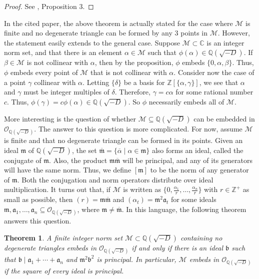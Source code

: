 \documentclass[10pt]{amsart}
\newcommand{\M}{\mathcal{M}}
\newcommand{\Q}{\mathbb{Q}}
\newcommand{\Z}{\mathbb{Z}}
\newcommand{\C}{\mathbb{C}}
\renewcommand{\a}{\mathfrak{a}}
\renewcommand{\b}{\mathfrak{b}}
\newcommand{\m}{\mathfrak{m}}
\renewcommand{\bar}{\overline}
\newcommand{\thefield}{\Q(\sqrt{-D})}
\newcommand{\thering}{\mathcal{O}_{\Q(\sqrt{-D})}}
\newcommand{\norm}[1]{\left[#1\right]}
\newtheorem{thm}{Theorem}
\begin{document}
\begin{proof}
See \cite{Kn15}, Proposition 3.
\end{proof}

In the cited paper, the above theorem is actually stated for the case where $\M$ is finite and no degenerate triangle can be formed by any 3 points in $\M$.  However, the statement easily extends to the general case.  Suppose $\M \subset \C$ is an integer norm set, and that there is an element $\alpha \in \M$ such that $\phi(\alpha) \in \Q(\sqrt{-D})$.  If $\beta \in \M$ is not collinear with $\alpha$, then by the proposition, $\phi$ embeds $\{0,\alpha,\beta\}$.  Thus, $\phi$ embeds every point of $\M$ that is not collinear with $\alpha$.  Consider now the case of a point $\gamma$ collinear with $\alpha$.  Letting $\{\delta\}$ be a basis for $\Z[\{\alpha,\gamma\}]$, we see that $\alpha$ and $\gamma$ must be integer multiples of $\delta$.  Therefore, $\gamma = c \alpha$ for some rational number $c$.  Thus, $\phi(\gamma) = c\phi(\alpha) \in \Q(\sqrt{-D})$.  So $\phi$ necessarily embeds all of $\M$.

More interesting is the question of whether $\M \subseteq \Q(\sqrt{-D})$ can be embedded in $\thering$.  The answer to this question is more complicated.  For now, assume $\M$ is finite and that no degenerate triangle can be formed in its points.  Given an ideal $\m$ of $\Q(\sqrt{-D})$, the set $\bar{\m} = \{\bar{\alpha} \mid \alpha \in \m\}$ also forms an ideal, called the conjugate of $\m$.  Also, the product $\m\bar{\m}$ will be principal, and any of its generators will have the same norm.  Thus, we define $\norm{\m}$ to be the norm of any generator of $\m$.  Both the conjugation and norm operators distribute over ideal multiplication.  It turns out that, if $\M$ is written as $\{0, \frac{\alpha_1}{r}, \dots, \frac{\alpha_n}{r}\}$ with $r \in \Z^+$ as small as possible, then $(r) = \m \bar{\m}$ and $(\alpha_t) = \m^2\a_t$ for some ideals $\m,\a_1, \dots , \a_n \subseteq \thering$, where $\m \neq \bar{\m}$.  In this language, the following theorem answers this question.

\begin{thm} \label{thm:planemb}
\normalfont
A finite integer norm set $\M \subset \thefield$ containing no degenerate triangles embeds in $\thering$ if and only if there is an ideal $\b$ such that $\b \mid \a_1 + \cdots + \a_n$ and $\m^2\b^2$ is principal.  In particular, $\M$ embeds in $\thering$ if the square of every ideal is principal.
\end{thm}
\end{document}
